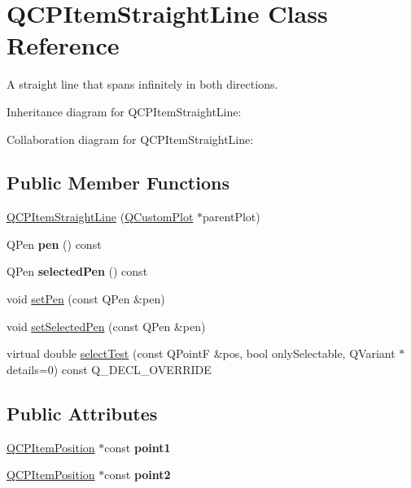 \hypertarget{classQCPItemStraightLine}{}\section{Q\+C\+P\+Item\+Straight\+Line Class Reference}
\label{classQCPItemStraightLine}


A straight line that spans infinitely in both directions.  




Inheritance diagram for Q\+C\+P\+Item\+Straight\+Line\+:


Collaboration diagram for Q\+C\+P\+Item\+Straight\+Line\+:
\subsection*{Public Member Functions}
\begin{DoxyCompactItemize}
\item 
\hyperlink{classQCPItemStraightLine_a41fd2e1f006983449eca9830930c3b10}{Q\+C\+P\+Item\+Straight\+Line} (\hyperlink{classQCustomPlot}{Q\+Custom\+Plot} $\ast$parent\+Plot)
\item 
\mbox{\label{classQCPItemStraightLine_aa751d46cf36073607c11508763f85ff6}} 
Q\+Pen {\bfseries pen} () const
\item 
\mbox{\label{classQCPItemStraightLine_ae4a4607045b1d0594f89eee448a31ff9}} 
Q\+Pen {\bfseries selected\+Pen} () const
\item 
void \hyperlink{classQCPItemStraightLine_a9f36c9c9e60d7d9ac084c80380ac8601}{set\+Pen} (const Q\+Pen \&pen)
\item 
void \hyperlink{classQCPItemStraightLine_a5c33559498d33543fa95cf0a36e851ff}{set\+Selected\+Pen} (const Q\+Pen \&pen)
\item 
virtual double \hyperlink{classQCPItemStraightLine_a2e36c9d4dcc3aeda78a5584f790e39e3}{select\+Test} (const Q\+PointF \&pos, bool only\+Selectable, Q\+Variant $\ast$details=0) const Q\+\_\+\+D\+E\+C\+L\+\_\+\+O\+V\+E\+R\+R\+I\+DE
\end{DoxyCompactItemize}
\subsection*{Public Attributes}
\begin{DoxyCompactItemize}
\item 
\mbox{\label{classQCPItemStraightLine_ac131a6ffe456f2cc7364dce541fe0120}} 
\hyperlink{classQCPItemPosition}{Q\+C\+P\+Item\+Position} $\ast$const {\bfseries point1}
\item 
\mbox{\label{classQCPItemStraightLine_ad26c0a732e471f63f75d481dcd48cfc9}} 
\hyperlink{classQCPItemPosition}{Q\+C\+P\+Item\+Position} $\ast$const {\bfseries point2}
\end{DoxyCompactItemize}
